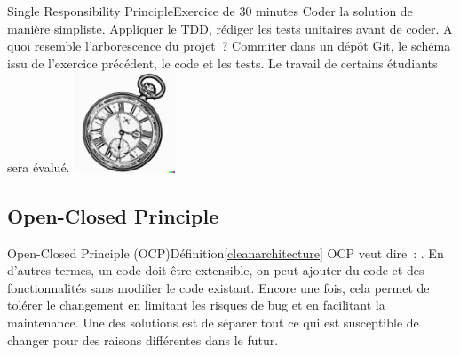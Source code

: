 \documentclass{beamer}
\begin{document}
    \begin{frame}{Single Responsibility Principle}{Exercice \execcounterdispinc{} de 30 minutes}
        Coder la solution de manière simpliste.
        \bigbreak
        Appliquer le TDD, rédiger les tests unitaires avant de coder.
        \bigbreak
        A quoi resemble l'arborescence du projet~?
        \bigbreak
        Commiter dans un dépôt Git, le schéma issu de l'exercice précédent, le code et les tests.
        \bigbreak
        Le travail de certains étudiants sera évalué.
        \bigbreak
        \centering
        \includegraphics[width=3cm]{image/engraving-of-an-old-watch}
    \end{frame}

    \subsection{Open-Closed Principle}\label{subsec:mid-level-o}

    \begin{frame}{Open-Closed Principle (OCP)}{Définition\cref{cleanarchitecture}}
        OCP veut dire~: .
        \bigbreak
        En d'autres termes, un code doit être extensible, on peut ajouter du code et des fonctionnalités sans modifier le code existant.
        Encore une fois, cela permet de tolérer le changement en limitant les risques de bug et en facilitant la maintenance.
        \bigbreak
        Une des solutions est de séparer tout ce qui est susceptible de changer pour des raisons différentes dans le futur.
    \end{frame}
\end{document}
